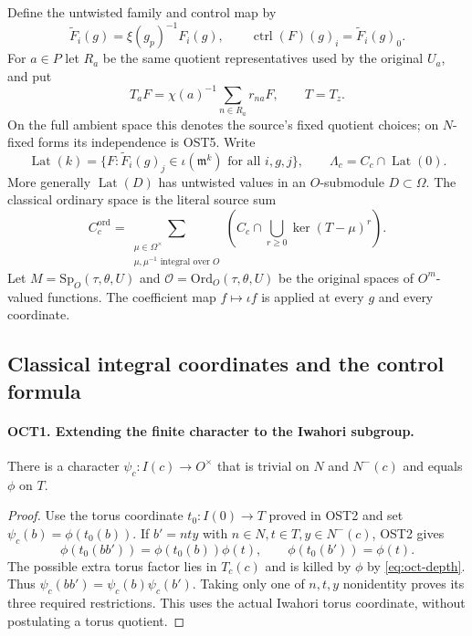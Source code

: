 Define the untwisted family and control map by
\begin{equation}\label{eq:oct-control}
 \widetilde F_i(g)=\xi(g_p)^{-1}F_i(g),\qquad
 \operatorname{ctrl}(F)(g)_i=\widetilde F_i(g)_0.
\end{equation}
For $a\in P$ let $R_a$ be the same quotient representatives used by
the original $U_a$, and put
\begin{equation}\label{eq:oct-T}
 T_aF=\chi(a)^{-1}\sum_{n\in R_a}r_{na}F,
       \qquad T=T_z.
\end{equation}
On the full ambient space this denotes the source's fixed quotient
choices; on $N$-fixed forms its independence is OST5.  Write
\[
 \operatorname{Lat}(k)=
 \{F:\widetilde F_i(g)_j\in\iota(\mathfrak m^k)
                  \text{ for all }i,g,j\},\qquad
 \Lambda_c=C_c\cap\operatorname{Lat}(0).
\]
More generally $\operatorname{Lat}(D)$ has untwisted values in an
$O$-submodule $D\subset\Omega$.  The classical ordinary space is
the literal source sum
\begin{equation}\label{eq:oct-clord}
 C_c^{\mathrm{ord}}=
 \sum_{\substack{\mu\in\Omega^\times\\
                  \mu,\mu^{-1}\text{ integral over }O}}
           \left(C_c\cap\bigcup_{r\geq0}\ker(T-\mu)^r\right).
\end{equation}
Let $M=\mathrm{Sp}_O(\tau,\theta,U)$ and
$\mathcal O=\mathrm{Ord}_O(\tau,\theta,U)$ be the original spaces
of $O^m$-valued functions.  The coefficient map $f\mapsto\iota f$
is applied at every $g$ and every coordinate.

\subsection{Classical integral coordinates and the control formula}

\paragraph{OCT1. Extending the finite character to the Iwahori subgroup.}
\label{claim:OCT1}
There is a character $\psi_c:I(c)\to O^\times$ that is trivial
on $N$ and $N^-(c)$ and equals $\phi$ on $T$.
\begin{proof}
Use the torus coordinate $t_0:I(0)\to T$ proved in OST2 and set
$\psi_c(b)=\phi(t_0(b))$.  If $b'=nty$ with
$n\in N,t\in T,y\in N^-(c)$, OST2 gives
\[
 \phi(t_0(bb'))=\phi(t_0(b))\phi(t),\qquad
 \phi(t_0(b'))=\phi(t).
\]
The possible extra torus factor lies in $T_c(c)$ and is killed by
$\phi$ by \eqref{eq:oct-depth}.  Thus $\psi_c(bb')=
\psi_c(b)\psi_c(b')$.  Taking only one of $n,t,y$ nonidentity
proves its three required restrictions.  This uses the actual
Iwahori torus coordinate, without postulating a torus quotient.
\end{proof}

